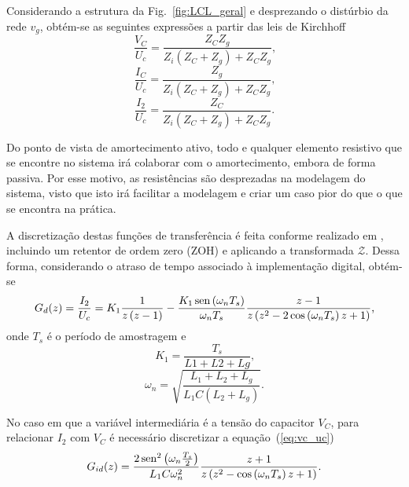     Considerando a estrutura da Fig.~\ref{fig:LCL_geral} e desprezando o distúrbio da rede $v_g$, obtém-se as seguintes expressões a partir das leis de Kirchhoff
    \begin{equation}
        \frac{V_C}{U_c} = \frac{Z_C Z_g}{Z_i \left( Z_C + Z_g \right) + Z_C Z_g}
        \text{,}
        \label{eq:vc_uc}
    \end{equation}
    \begin{equation}
        \frac{I_C}{U_c} = \frac{Z_g}{Z_i \left( Z_C + Z_g \right) + Z_C Z_g}
        \text{,}
        \label{eq:ic_uc}
    \end{equation}
    \begin{equation}
        \frac{I_2}{U_c} = \frac{Z_C}{Z_i \left( Z_C + Z_g \right) + Z_C Z_g}
        \text{.}
    \end{equation}

    Do ponto de vista de amortecimento ativo, todo e qualquer elemento resistivo que se encontre no sistema irá colaborar com o amortecimento, embora de forma passiva. Por esse motivo, as resistências são desprezadas na modelagem do sistema, visto que isto irá facilitar a modelagem e criar um caso pior do que o que se encontra na prática.

    A discretização destas funções de transferência é feita conforme realizado em \cite{ref:PARKER}, incluindo um retentor de ordem zero (ZOH) e aplicando a transformada $\mathcal{Z}$. Dessa forma, considerando o atraso de tempo associado à implementação digital, obtém-se
    \begin{equation}
        G_d (z) = \frac{I_2}{U_c} = K_1 \frac{1}{z \left( z-1 \right)}
        - \frac{K_1 \operatorname{sen} \left( \omega_n T_s \right) }{\omega_n T_s}
        \frac{z-1}{z \left( z^2 - 2 \cos\left( \omega_n T_s \right) z +1 \right) }
        \text{,}
    \end{equation}
    onde $T_s$ é o período de amostragem e
    \begin{equation}
        K_1 = \frac{T_s}{L1 + L2 + Lg} \text{,}
    \end{equation}
    \begin{equation}
        \omega_n = \sqrt{\frac{ L_1 + L_2 + L_g }{ L_1 C \left( L_2 + L_g \right)}}
        \text{.}
    \end{equation}

    No caso em que a variável intermediária é a tensão do capacitor $V_C$, para relacionar $I_2$ com $V_C$ é necessário discretizar a equação~(\ref{eq:vc_uc})
    \begin{equation}
        G_{id}(z) = \frac{2 \operatorname{sen}^2 \left( \omega_n \frac{T_s}{2} \right)}{L_1 C \omega_n^2}
            \frac{z+1}{z \left( z^2 - \cos \left( \omega_n T_s \right) z + 1 \right)}
            \text{.}
    \end{equation}

